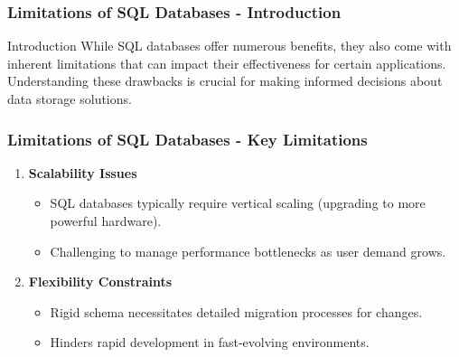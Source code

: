 \documentclass[aspectratio=169]{beamer}
\begin{document}
\begin{frame}[fragile]
    \frametitle{Limitations of SQL Databases - Introduction}
    \begin{block}{Introduction}
        While SQL databases offer numerous benefits, they also come with inherent limitations that can impact their effectiveness for certain applications. Understanding these drawbacks is crucial for making informed decisions about data storage solutions.
    \end{block}
\end{frame}

\begin{frame}[fragile]
    \frametitle{Limitations of SQL Databases - Key Limitations}
    \begin{enumerate}
        \item \textbf{Scalability Issues}
            \begin{itemize}
                \item SQL databases typically require vertical scaling (upgrading to more powerful hardware).
                \item Challenging to manage performance bottlenecks as user demand grows.
            \end{itemize}
        \item \textbf{Flexibility Constraints}
            \begin{itemize}
                \item Rigid schema necessitates detailed migration processes for changes.
                \item Hinders rapid development in fast-evolving environments.
            \end{itemize}
    \end{enumerate}
\end{frame}
\end{document}
